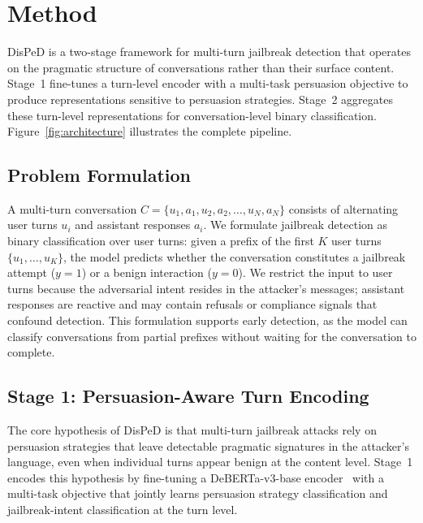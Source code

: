 
\section{Method}
\label{sec:method}

DisPeD is a two-stage framework for multi-turn jailbreak detection that operates on the pragmatic structure of conversations rather than their surface content. Stage~1 fine-tunes a turn-level encoder with a multi-task persuasion objective to produce representations sensitive to persuasion strategies. Stage~2 aggregates these turn-level representations for conversation-level binary classification. Figure~\ref{fig:architecture} illustrates the complete pipeline.

\subsection{Problem Formulation}

A multi-turn conversation $C = \{u_1, a_1, u_2, a_2, \ldots, u_N, a_N\}$ consists of alternating user turns $u_i$ and assistant responses $a_i$. We formulate jailbreak detection as binary classification over user turns: given a prefix of the first $K$ user turns $\{u_1, \ldots, u_K\}$, the model predicts whether the conversation constitutes a jailbreak attempt ($y=1$) or a benign interaction ($y=0$). We restrict the input to user turns because the adversarial intent resides in the attacker's messages; assistant responses are reactive and may contain refusals or compliance signals that confound detection. This formulation supports early detection, as the model can classify conversations from partial prefixes without waiting for the conversation to complete.

\subsection{Stage 1: Persuasion-Aware Turn Encoding}
\label{sec:stage1}

The core hypothesis of DisPeD is that multi-turn jailbreak attacks rely on persuasion strategies that leave detectable pragmatic signatures in the attacker's language, even when individual turns appear benign at the content level. Stage~1 encodes this hypothesis by fine-tuning a DeBERTa-v3-base encoder~\citep{he2021deberta} with a multi-task objective that jointly learns persuasion strategy classification and jailbreak-intent classification at the turn level.

